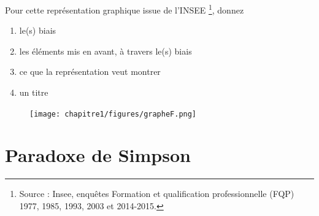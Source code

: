 \documentclass[10pt, a4paper]{article}
\begin{document}
\begin{tcolorbox}[lefttitle=2cm, colframe=gray!75!black, colback=white, title=\textbf{EXERCICE 3 : Toujours de l'analyse de représentation}]


Pour cette représentation graphique issue de l'INSEE \footnote{Source : Insee, enquêtes Formation et qualification professionnelle (FQP) 1977, 1985, 1993, 2003 et 2014-2015.}, donnez

\begin{enumerate}
    \item le(s) biais
    \item les éléments mis en avant, à travers le(s) biais
    \item ce que la représentation veut montrer
    \item un titre 
\end{enumerate}
\begin{figure}[H]
    \texttt{[image: chapitre1/figures/grapheF.png]}
    \caption{}
    \label{fig:enter-label}
\end{figure}

\vspace{5cm}
\end{tcolorbox}

\newpage




\section{Paradoxe de Simpson}
\end{document}
